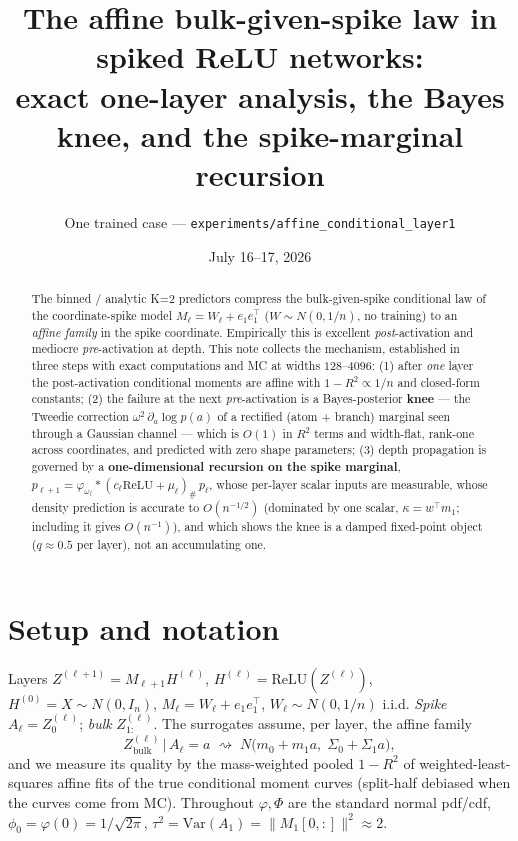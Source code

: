 \documentclass[10pt]{article}
\title{The affine bulk-given-spike law in spiked ReLU networks:\\
exact one-layer analysis, the Bayes knee, and the spike-marginal recursion}
\author{One trained case --- \texttt{experiments/affine\_conditional\_layer1}}
\date{July 16--17, 2026}
\newcommand{\ReLU}{\mathrm{ReLU}}
\newcommand{\Var}{\mathrm{Var}}
\begin{document}
\maketitle

\begin{abstract}
\noindent
The binned / analytic K=2 predictors compress the bulk-given-spike conditional law of the
coordinate-spike model $M_\ell = W_\ell + e_1e_1^\top$ ($W\sim N(0,1/n)$, no training) to an
\emph{affine family} in the spike coordinate. Empirically this is excellent
\emph{post}-activation and mediocre \emph{pre}-activation at depth. This note collects the
mechanism, established in three steps with exact computations and MC at widths $128$--$4096$:
(1) after \emph{one} layer the post-activation conditional moments are affine with
$1-R^2\propto 1/n$ and closed-form constants;
(2) the failure at the next \emph{pre}-activation is a Bayes-posterior \textbf{knee} --- the
Tweedie correction $\omega^2\,\partial_a\log p(a)$ of a rectified (atom + branch) marginal seen
through a Gaussian channel --- which is $O(1)$ in $R^2$ terms and width-flat, rank-one across
coordinates, and predicted with zero shape parameters;
(3) depth propagation is governed by a \textbf{one-dimensional recursion on the spike marginal},
$p_{\ell+1} = \varphi_{\omega_\ell} * (c_\ell\ReLU + \mu_\ell)_{\#}\,p_\ell$, whose per-layer
scalar inputs are measurable, whose density prediction is accurate to $O(n^{-1/2})$ (dominated by
one scalar, $\kappa=w^\top m_1$; including it gives $O(n^{-1})$), and which shows the knee is a
damped fixed-point object ($q\approx 0.5$ per layer), not an accumulating one.
\end{abstract}

\section{Setup and notation}
Layers $Z^{(\ell+1)} = M_{\ell+1} H^{(\ell)}$, $H^{(\ell)}=\ReLU(Z^{(\ell)})$, $H^{(0)}=X\sim N(0,I_n)$,
$M_\ell = W_\ell + e_1e_1^\top$, $W_\ell\sim N(0,1/n)$ i.i.d. \emph{Spike} $A_\ell = Z^{(\ell)}_0$;
\emph{bulk} $Z^{(\ell)}_{1:}$. The surrogates assume, per layer, the affine family
\[
Z^{(\ell)}_{\mathrm{bulk}} \,\big|\, A_\ell = a \;\rightsquigarrow\;
N\!\big(m_0 + m_1 a,\; \Sigma_0 + \Sigma_1 a\big),
\]
and we measure its quality by the mass-weighted pooled $1-R^2$ of weighted-least-squares affine
fits of the true conditional moment curves (split-half debiased when the curves come from MC).
Throughout $\varphi,\Phi$ are the standard normal pdf/cdf, $\phi_0 = \varphi(0)=1/\sqrt{2\pi}$,
$\tau^2 = \Var(A_1) = \|M_1[0,:]\|^2 \approx 2$.
\end{document}
